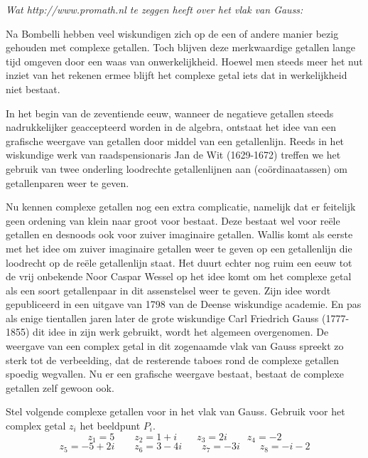 \documentclass[12pt,twoside,a4paper]{article}
\begin{document}
\vspace*{1cm}
\begin{mdframed}%
{\em Wat http://www.promath.nl te zeggen heeft over het vlak van Gauss:}

Na Bombelli hebben veel wiskundigen zich op de een of andere manier bezig gehouden met complexe getallen. Toch blijven deze merkwaardige getallen lange tijd omgeven door een waas van onwerkelijkheid. Hoewel men steeds meer het nut inziet van het rekenen ermee blijft het complexe getal iets dat in werkelijkheid niet bestaat.

In het begin van de zeventiende eeuw, wanneer de negatieve getallen steeds nadrukkelijker geaccepteerd worden in de algebra, ontstaat het idee van een grafische weergave van getallen door middel van een getallenlijn. Reeds in het wiskundige werk van raadspensionaris Jan de Wit (1629-1672) treffen we het gebruik van twee onderling loodrechte getallenlijnen aan (coördinaatassen) om getallenparen weer te geven.

Nu kennen complexe getallen nog een extra complicatie, namelijk dat er feitelijk geen ordening van klein naar groot voor bestaat. Deze bestaat wel voor reële getallen en desnoods ook voor zuiver imaginaire getallen. Wallis komt als eerste met het idee om zuiver imaginaire getallen weer te geven op een getallenlijn die loodrecht op de reële getallenlijn staat. Het duurt echter nog ruim een eeuw tot de vrij onbekende Noor Caspar Wessel op het idee komt om het complexe getal als een soort getallenpaar in dit assenstelsel weer te geven. Zijn idee wordt gepubliceerd in een uitgave van 1798 van de Deense wiskundige academie. En pas als enige tientallen jaren later de grote wiskundige Carl Friedrich Gauss (1777-1855) dit idee in zijn werk gebruikt, wordt het algemeen overgenomen. De weergave van een complex getal in dit zogenaamde vlak van Gauss spreekt zo sterk tot de verbeelding, dat de resterende taboes rond de complexe getallen spoedig wegvallen. Nu er een grafische weergave bestaat, bestaat de complexe getallen zelf gewoon ook.
\end{mdframed}


\begin{oefening}
Stel volgende complexe getallen voor in het vlak van Gauss. Gebruik voor het complex getal $z_i$ het beeldpunt $P_i$.
$$z_1=5 \qquad z_2=1+i \qquad  z_3=2i \qquad  z_4=-2$$
$$z_5=-5+2i \qquad  z_6=3-4i \qquad  z_7=-3i \qquad  z_8=-i-2$$
\end{oefening}
\end{document}
